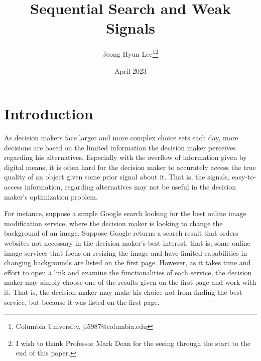 \documentclass[12pt]{article}
\title{Sequential Search and Weak Signals}
\author{Jeong Hyun Lee\thanks{Columbia University, jl5987@columbia.edu}\thanks{I wish to thank Professor Mark Dean for the seeing through the start to the end of this paper.}}
\date{April 2023}
\begin{document}
\maketitle


\section{Introduction}
As decision makers face larger and more complex choice sets each day, more decisions are based on the limited information the decision maker perceives regarding his alternatives. Especially with the overflow of information given by digital means, it is often hard for the decision maker to accurately access the true quality of an object given some prior signal about it. That is, the signals, easy-to-access information, regarding alternatives may not be useful in the decision maker's optimization problem.

For instance, suppose a simple Google search looking for the best online image modification service, where the decision maker is looking to change the background of an image. Suppose Google returns a search result that orders websites not necessary in the decision maker's best interest, that is, some online image services that focus on resizing the image and have limited capabilities in changing backgrounds are listed on the first page. However, as it takes time and effort to open a link and examine the functionalities of each service, the decision maker may simply choose one of the results given on the first page and work with it. That is, the decision maker may make his choice not from finding the best service, but because it was listed on the first page.
\end{document}
